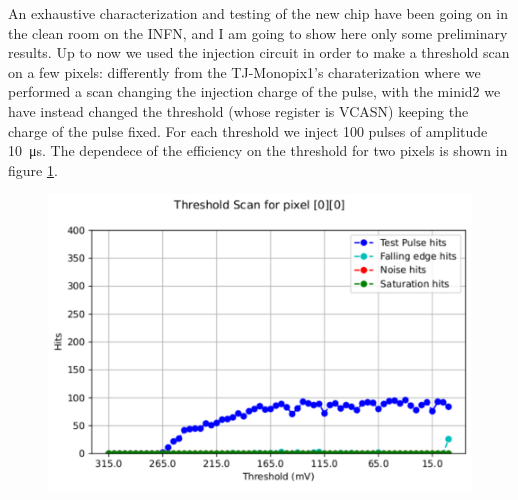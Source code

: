     An exhaustive characterization and testing of the new chip have been going on in the clean room on the INFN, and I am going to show here only some preliminary results.
    Up to now we used the injection circuit in order to make a threshold scan on a few pixels: differently from the TJ-Monopix1's charaterization where we performed a scan changing the injection charge of the pulse, with the minid2 we have instead changed the threshold (whose register is VCASN) keeping the charge of the pulse fixed.
    For each threshold we inject 100 pulses of amplitude \SI{10}{\us}. The dependece of the efficiency on the threshold for two pixels is shown in figure \ref{fig:ARCADIA_threshold}.  
    \begin{figure}[h!]
        \centering
        \includegraphics[width=.7\linewidth]{figures/charaterization/ARCADIA/threshold_0_0.pdf}
        \caption{}
        \label{fig:ARCADIA_threshold}
    \end{figure} 
    


